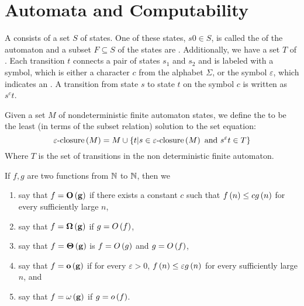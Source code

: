 \chapter{Automata and Computability}

\begin{defi}
A  consists of a set $S$ of states. One of these states, $s0\in S$, is called the  of the automaton and a subset $F\subseteq S$ of the states are . Additionally, we have a set $T$ of . Each transition $t$ connects a pair of states $s_1$ and $s_2$ and is labeled with a symbol, which is either a character $c$ from the alphabet $\Sigma$, or the symbol $\varepsilon$, which indicates an . A transition from state $s$ to state $t$ on the symbol $c$ is written as $s^ct$.\cite{mogensen2009basics}
\end{defi}

\begin{defi}
Given a set $M$ of nondeterministic finite automaton states, we define the  to be the least (in terms of the subset relation) solution to the set equation:
\begin{equation}
\varepsilon\mbox{-closure}\left(M\right) = M\cup \left\{t|s\in \varepsilon\mbox{-closure}\left(M\right)\mbox{ and }s^\varepsilon t\in T \right\}
\end{equation}
Where $T$ is the set of transitions in the non deterministic finite automaton.\cite{mogensen2009basics}
\end{defi}

\begin{defi}
If $f,g$ are two functions from $\mathbb{N}$ to $\mathbb{N}$, then we
\begin{enumerate}
 \item say that $f=\term{\bigoh{g}}$ if there exists a constant $c$ such that $f\left(n\right)\leq cg\left(n\right)$ for every sufficiently large $n$,
 \item say that $f=\term{\bigomega{g}}$ if $g = O\left(f\right)$,
 \item say that $f=\term{\bigtheta{g}}$ is $f = O\left(g\right)$ and $g = O\left(f\right)$,
 \item say that $f=\term{\smalloh{g}}$ if for every $\varepsilon>0$, $f\left(n\right)\leq\varepsilon g\left(n\right)$ for every sufficiently large $n$, and
 \item say that $f=\term{\smallomega{g}}$ if $g=o\left(f\right)$.
\end{enumerate}
\cite{arora2009computational}
\end{defi}


